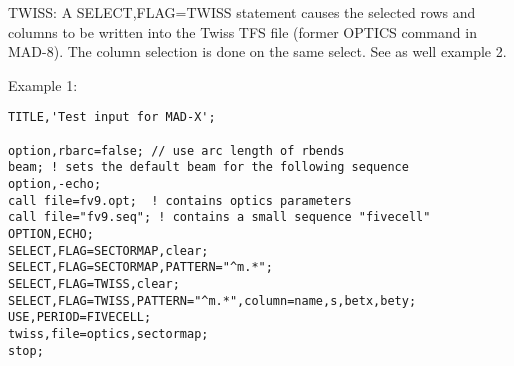TWISS: A SELECT,FLAG=TWISS statement causes the selected rows and
columns to be written into the Twiss TFS file (former OPTICS command in
MAD-8). The column selection is done on the same select. See as well
example 2.  

Example 1:  
\begin{verbatim}
TITLE,'Test input for MAD-X';

option,rbarc=false; // use arc length of rbends
beam; ! sets the default beam for the following sequence
option,-echo;
call file=fv9.opt;  ! contains optics parameters
call file="fv9.seq"; ! contains a small sequence "fivecell"
OPTION,ECHO;
SELECT,FLAG=SECTORMAP,clear;
SELECT,FLAG=SECTORMAP,PATTERN="^m.*";
SELECT,FLAG=TWISS,clear;
SELECT,FLAG=TWISS,PATTERN="^m.*",column=name,s,betx,bety;
USE,PERIOD=FIVECELL;
twiss,file=optics,sectormap;
stop;
\end{verbatim} 

